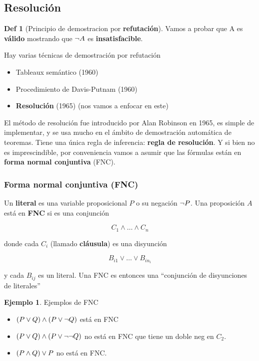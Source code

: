 \documentclass{report}
\theoremstyle{definition} %
\newtheorem*{definition*}{Def}
\newtheorem*{example*}{Ejemplo}
\begin{document}
\subsection{Resolución}

\begin{definition*}[Principio de demostracion por \textbf{refutación}]
    Vamos a probar que A es \textbf{válido} mostrando que $\neg A$ es \textbf{insatisfacible}.
\end{definition*}

Hay varias técnicas de demostración por refutación

\begin{itemize}
    \item Tableaux semántico (1960)
    \item Procedimiento de Davis-Putnam (1960)
    \item \textbf{Resolución} (1965) (nos vamos a enfocar en este)
\end{itemize}

El método de resolución fue introducido por Alan Robinson en 1965, es simple de
implementar, y se usa mucho en el ámbito de demostración automática de teoremas.
Tiene una única regla de inferencia: \textbf{regla de resolución}. Y si bien no
es imprescindible, por conveniencia vamos a asumir que las fórmulas están en
\textbf{forma normal conjuntiva} (FNC).

\subsubsection{Forma normal conjuntiva (FNC)}

Un \textbf{literal} es una variable proposicional $P$ o su negación $\neg P$.
Una proposición $A$ está en \textbf{FNC} si es una conjunción

\[
    C_1 \wedge \dots \wedge C_n
\]

donde cada $C_i$ (llamado \textbf{cláusula}) es una disyunción

\[
    B_{i1} \vee \dots \vee B_{in_i}
\]

y cada $B_{ij}$ es un literal. Una FNC es entonces una ``conjunción de
disyunciones de literales''

\begin{example*}Ejemplos de FNC
    \begin{itemize}
        \item $(P \vee Q) \wedge (P \vee \neg Q)$ está en FNC
        \item $(P \vee Q) \wedge (P \vee \neg \neg Q)$ no está en FNC que
        tiene un doble neg en $C_2$.
        \item $(P \wedge Q) \vee P$ no está en FNC.
    \end{itemize}
\end{example*}
\end{document}
